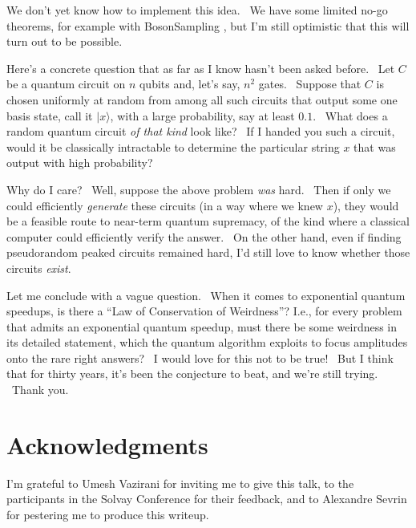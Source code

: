 \documentclass[12pt]{article}
\begin{document}
\noindent We don't yet know how to implement this idea. \ We have some limited no-go theorems, for example with BosonSampling \cite{anguyen,berkowitzdevlin}, but I'm still optimistic that this will turn out to be possible.

Here's a concrete question that as far as I know hasn't been asked before. \ Let $C$ be a quantum circuit on $n$ qubits and, let's say, $n^2$ gates. \ Suppose that $C$ is chosen uniformly at random from among all such circuits that output some one basis state, call it $|x\rangle$, with a large probability, say at least $0.1$. \ What does a random quantum circuit \emph{of that kind} look like? \ If I handed you such a circuit, would it be classically intractable to determine the particular string $x$ that was output with high probability?

Why do I care? \ Well, suppose the above problem \emph{was} hard. \ Then if only we could efficiently \emph{generate} these circuits (in a way where we knew $x$), they would be a feasible route to near-term quantum supremacy, of the kind where a classical computer could efficiently verify the answer. \ On the other hand, even if finding pseudorandom peaked circuits remained hard, I'd still love to know whether those circuits \emph{exist}.

Let me conclude with a vague question. \ When it comes to exponential quantum speedups, is there a ``Law of Conservation of Weirdness''?  I.e., for every problem that admits an exponential quantum speedup, must there be some weirdness in its detailed statement, which the quantum algorithm exploits to focus amplitudes onto the rare right answers? \ I would love for this not to be true! \ But I think that for thirty years, it's been the conjecture to beat, and we're still trying. \ Thank you.

\section{Acknowledgments}

I'm grateful to Umesh Vazirani for inviting me to give this talk, to the participants in the Solvay Conference for their feedback, and to Alexandre Sevrin for pestering me to produce this writeup.



\end{document}
